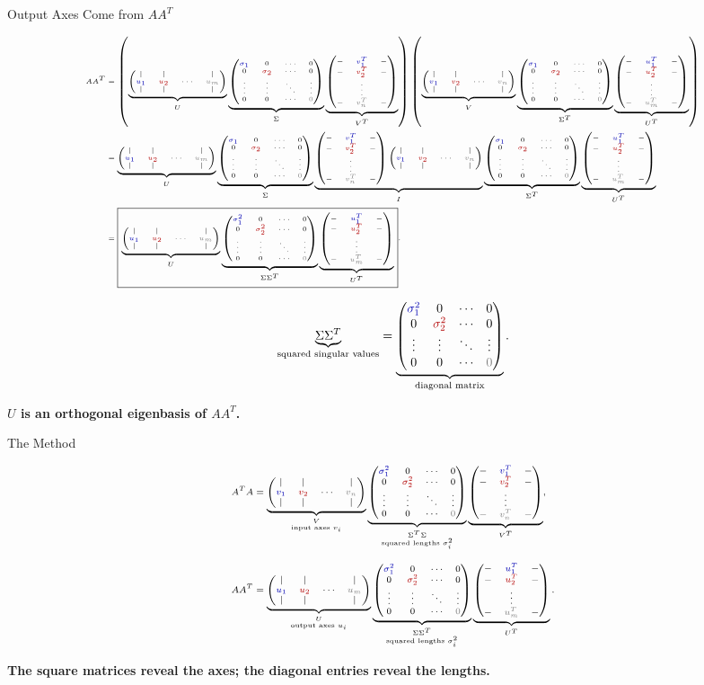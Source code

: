\documentclass[10pt]{beamer}
\theoremstyle{definition}
\newcommand{\x}[1]{\alert{\textbf{#1}}}
\newcommand{\rd}[1]{{\color{red!70!black}#1}}
\newcommand{\bl}[1]{{\color{blue!70!black}#1}}
\newcommand{\gry}[1]{{\color{gray}#1}}
\newcommand{\Vcols}{\begin{pmatrix}|&|& &|\\ \bl{v_1}&\rd{v_2}&\cdots&\gry{v_n}\\ |&|& &|\end{pmatrix}}
\newcommand{\Ucols}{\begin{pmatrix}|&|& &|\\ \bl{u_1}&\rd{u_2}&\cdots&\gry{u_m}\\ |&|& &|\end{pmatrix}}
\newcommand{\Vrows}{\begin{pmatrix}-&\bl{v_1^T}&-\\ -&\rd{v_2^T}&-\\ &\vdots&\\ -&\gry{v_n^T}&-\end{pmatrix}}
\newcommand{\Urows}{\begin{pmatrix}-&\bl{u_1^T}&-\\ -&\rd{u_2^T}&-\\ &\vdots&\\ -&\gry{u_m^T}&-\end{pmatrix}}
\newcommand{\Sigdisplay}{\begin{pmatrix}\bl{\sigma_1}&0&\cdots&0\\ 0&\rd{\sigma_2}&\cdots&0\\ \vdots&\vdots&\ddots&\vdots\\ 0&0&\cdots&\gry{0}\end{pmatrix}}
\newcommand{\SigTsigdisplay}{\begin{pmatrix}\bl{\sigma_1^2}&0&\cdots&0\\ 0&\rd{\sigma_2^2}&\cdots&0\\ \vdots&\vdots&\ddots&\vdots\\ 0&0&\cdots&\gry{0}\end{pmatrix}}
\begin{document}
\begin{frame}[shrink=35]{Output Axes Come from $AA^T$}

\[
\tiny
\begin{aligned}
AA^T
&=
\left(
\underbrace{\Ucols}_{U}
\underbrace{\Sigdisplay}_{\Sigma}
\underbrace{\Vrows}_{V^T}
\right)
\left(
\underbrace{\Vcols}_{V}
\underbrace{\Sigdisplay}_{\Sigma^T}
\underbrace{\Urows}_{U^T}
\right)\\
&=
\underbrace{\Ucols}_{U}
\underbrace{\Sigdisplay}_{\Sigma}
\underbrace{\Vrows\Vcols}_{I}
\underbrace{\Sigdisplay}_{\Sigma^T}
\underbrace{\Urows}_{U^T}\\
&=
\boxed{
\underbrace{\Ucols}_{U}
\underbrace{\SigTsigdisplay}_{\Sigma\Sigma^T}
\underbrace{\Urows}_{U^T}
}.
\end{aligned}
\]

\vfill

\[
\underbrace{\Sigma\Sigma^T}_{\text{squared singular values}}
=
\underbrace{\SigTsigdisplay}_{\text{diagonal matrix}}.
\]

\vfill

\begin{center}
\x{$U$ is an orthogonal eigenbasis of $AA^T$.}
\end{center}

\end{frame}


\begin{frame}[shrink=15]{The Method}

\[
\scriptsize
\begin{aligned}
A^TA
&=
\underbrace{\Vcols}_{\substack{V\\\text{input axes }v_i}}
\underbrace{\SigTsigdisplay}_{\substack{\Sigma^T\Sigma\\\text{squared lengths }\sigma_i^2}}
\underbrace{\Vrows}_{V^T},
\\[0.8em]
AA^T
&=
\underbrace{\Ucols}_{\substack{U\\\text{output axes }u_i}}
\underbrace{\SigTsigdisplay}_{\substack{\Sigma\Sigma^T\\\text{squared lengths }\sigma_i^2}}
\underbrace{\Urows}_{U^T}.
\end{aligned}
\]

\vfill

\begin{center}
\x{The square matrices reveal the axes; the diagonal entries reveal the lengths.}
\end{center}

\end{frame}
\end{document}
